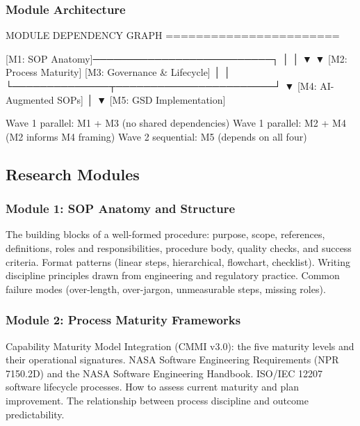 \documentclass[11pt,letterpaper]{article}
\begin{document}
\subsubsection{Module Architecture}

\begin{asciibox}
  MODULE DEPENDENCY GRAPH
  =======================

  [M1: SOP Anatomy]──────────────────────────┐
       │                                      │
       ▼                                      ▼
  [M2: Process Maturity]         [M3: Governance & Lifecycle]
       │                                      │
       └──────────────┬───────────────────────┘
                      ▼
             [M4: AI-Augmented SOPs]
                      │
                      ▼
             [M5: GSD Implementation]

  Wave 1 parallel: M1 + M3 (no shared dependencies)
  Wave 1 parallel: M2 + M4 (M2 informs M4 framing)
  Wave 2 sequential: M5 (depends on all four)
\end{asciibox}

\subsection{Research Modules}

\subsubsection{Module 1: SOP Anatomy and Structure}
The building blocks of a well-formed procedure: purpose, scope, references, definitions, roles and responsibilities, procedure body, quality checks, and success criteria. Format patterns (linear steps, hierarchical, flowchart, checklist). Writing discipline principles drawn from engineering and regulatory practice. Common failure modes (over-length, over-jargon, unmeasurable steps, missing roles).

\subsubsection{Module 2: Process Maturity Frameworks}
Capability Maturity Model Integration (CMMI v3.0): the five maturity levels and their operational signatures. NASA Software Engineering Requirements (NPR 7150.2D) and the NASA Software Engineering Handbook. ISO/IEC 12207 software lifecycle processes. How to assess current maturity and plan improvement. The relationship between process discipline and outcome predictability.
\end{document}

